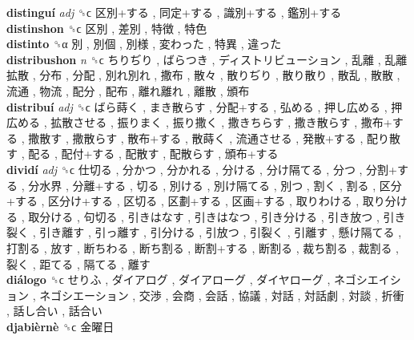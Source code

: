 \textbf{distinguí} \emph{adj}  ␝ϲ   区別+する ,  同定+する ,  識別+する ,  鑑別+する   \\
\textbf{distinshon} ␝ϲ   区別 ,  差別 ,  特徴 ,  特色   \\
\textbf{distinto} ␝α   別 ,  別個 ,  別様 ,  変わった ,  特異 ,  違った   \\
\textbf{distribushon} \emph{n}  ␝ϲ   ちりぢり ,  ばらつき ,  ディストリビューション ,  乱離 ,  乱離拡散 ,  分布 ,  分配 ,  別れ別れ ,  撒布 ,  散々 ,  散りぢり ,  散り散り ,  散乱 ,  散散 ,  流通 ,  物流 ,  配分 ,  配布 ,  離れ離れ ,  離散 ,  頒布   \\
\textbf{distribuí} \emph{adj}  ␝ϲ   ばら蒔く ,  まき散らす ,  分配+する ,  弘める ,  押し広める ,  押広める ,  拡散させる ,  振りまく ,  振り撒く ,  撒きちらす ,  撒き散らす ,  撒布+する ,  撒散す ,  撒散らす ,  散布+する ,  散蒔く ,  流通させる ,  発散+する ,  配り散す ,  配る ,  配付+する ,  配散す ,  配散らす ,  頒布+する   \\
\textbf{dividí} \emph{adj}  ␝ϲ   仕切る ,  分かつ ,  分かれる ,  分ける ,  分け隔てる ,  分つ ,  分割+する ,  分水界 ,  分離+する ,  切る ,  別ける ,  別け隔てる ,  別つ ,  割く ,  割る ,  区分+する ,  区分け+する ,  区切る ,  区劃+する ,  区画+する ,  取りわける ,  取り分ける ,  取分ける ,  句切る ,  引きはなす ,  引きはなつ ,  引き分ける ,  引き放つ ,  引き裂く ,  引き離す ,  引っ離す ,  引分ける ,  引放つ ,  引裂く ,  引離す ,  懸け隔てる ,  打割る ,  放す ,  断ちわる ,  断ち割る ,  断割+する ,  断割る ,  裁ち割る ,  裁割る ,  裂く ,  距てる ,  隔てる ,  離す   \\
\textbf{diálogo} ␝ϲ   せりふ ,  ダイアログ ,  ダイアローグ ,  ダイヤローグ ,  ネゴシエイション ,  ネゴシエーション ,  交渉 ,  会商 ,  会話 ,  協議 ,  対話 ,  対話劇 ,  対談 ,  折衝 ,  話し合い ,  話合い   \\
\textbf{djabièrnè} ␝ϲ   金曜日   \\
